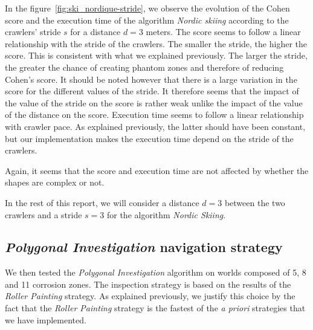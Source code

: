 \documentclass[english,RandD]{rapportPFE}  %
\begin{document}
			In the figure~\ref{fig:ski_nordique-stride}, we observe the evolution of the Cohen score and the execution time of the algorithm \textit{Nordic skiing} according to the crawlers' stride $s$ for a distance $d = 3$ meters.
			The score seems to follow a linear relationship with the stride of the crawlers.
			The smaller the stride, the higher the score.
			This is consistent with what we explained previously.
			The larger the stride, the greater the chance of creating phantom zones and therefore of reducing Cohen's score.
			It should be noted however that there is a large variation in the score for the different values of the stride.
			It therefore seems that the impact of the value of the stride on the score is rather weak unlike the impact of the value of the distance on the score.
			Execution time seems to follow a linear relationship with crawler pace.
			As explained previously, the latter should have been constant, but our implementation makes the execution time depend on the stride of the crawlers.

			Again, it seems that the score and execution time are not affected by whether the shapes are complex or not.

			In the rest of this report, we will consider a distance $d = 3$ between the two crawlers and a stride $s = 3$ for the algorithm \textit{Nordic Skiing}.
		\subsection*{\textit{Polygonal Investigation} navigation strategy}
			We then tested the \textit{Polygonal Investigation} algorithm on worlds composed of 5, 8 and 11 corrosion zones.
			The inspection strategy is based on the results of the \textit{Roller Painting} strategy.
			As explained previously, we justify this choice by the fact that the \textit{Roller Painting} strategy is the fastest of the \textit{a priori} strategies that we have implemented.
\end{document}
